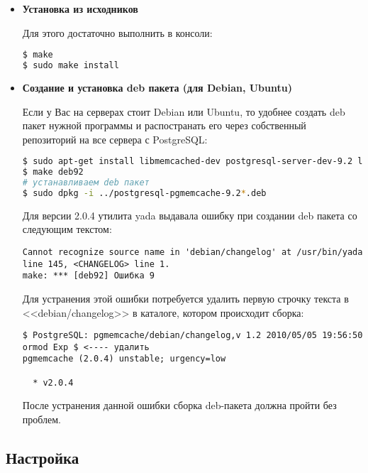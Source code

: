 \begin{itemize}
  \item \textbf{Установка из исходников}

Для этого достаточно выполнить в консоли:

\begin{lstlisting}[language=Bash,label=lst:pgcache1,caption=Установка из исходников]
$ make
$ sudo make install
\end{lstlisting}

  \item \textbf{Создание и установка deb пакета (для Debian, Ubuntu)}

Если у Вас на серверах стоит Debian или Ubuntu, то удобнее создать deb пакет нужной программы и распостранать его через собственный репозиторий на все сервера с PostgreSQL:

\begin{lstlisting}[language=Bash,label=lst:pgcache2,caption=Создание и установка deb пакета]
$ sudo apt-get install libmemcached-dev postgresql-server-dev-9.2 libpq-dev devscripts yada flex bison
$ make deb92
# устанавливаем deb пакет
$ sudo dpkg -i ../postgresql-pgmemcache-9.2*.deb
\end{lstlisting}

Для версии 2.0.4 утилита yada выдавала ошибку при создании deb пакета со следующим текстом:

\begin{lstlisting}[label=lst:pgcache3,caption=Создание и установка deb пакета]
Cannot recognize source name in 'debian/changelog' at /usr/bin/yada line 145, <CHANGELOG> line 1.
make: *** [deb92] Ошибка 9
\end{lstlisting}

Для устранения этой ошибки потребуется удалить первую строчку текста в <<debian/changelog>> в каталоге, котором происходит сборка:

\begin{lstlisting}[label=lst:pgcache4,caption=Создание и установка deb пакета]
$ PostgreSQL: pgmemcache/debian/changelog,v 1.2 2010/05/05 19:56:50 ormod Exp $ <---- удалить
pgmemcache (2.0.4) unstable; urgency=low

  * v2.0.4
\end{lstlisting}

После устранения данной ошибки сборка deb-пакета должна пройти без проблем.

\end{itemize}


\subsection{Настройка}

